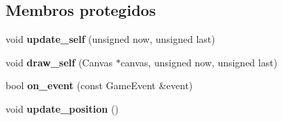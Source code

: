 \subsection*{Membros protegidos}
\begin{DoxyCompactItemize}
\item 
\mbox{\label{classCharacterSelection_ae398845f5f793f40ddf8314a0ad16f7e}} 
void {\bfseries update\+\_\+self} (unsigned now, unsigned last)
\item 
\mbox{\label{classCharacterSelection_a474bb5f07bc3c530b4988a463ff83bb5}} 
void {\bfseries draw\+\_\+self} (Canvas $\ast$canvas, unsigned now, unsigned last)
\item 
\mbox{\label{classCharacterSelection_af7d87f81c8bc895a89d9f13c09ed6b35}} 
bool {\bfseries on\+\_\+event} (const Game\+Event \&event)
\item 
\mbox{\label{classCharacterSelection_aa0a17d7b1a2092b9346c626d8c097253}} 
void {\bfseries update\+\_\+position} ()
\end{DoxyCompactItemize}
